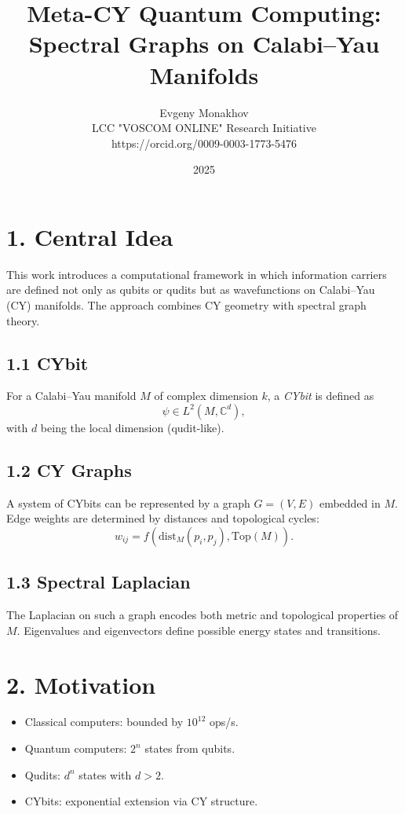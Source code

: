 \documentclass[12pt,a4paper]{article}
\title{Meta-CY Quantum Computing: Spectral Graphs on Calabi--Yau Manifolds}
\author{Evgeny Monakhov \\ LCC "VOSCOM ONLINE" Research Initiative \\ https://orcid.org/0009-0003-1773-5476}
\date{2025}
\begin{document}
\maketitle

\section*{1. Central Idea}
This work introduces a computational framework in which 
information carriers are defined not only as qubits or qudits 
but as wavefunctions on Calabi--Yau (CY) manifolds. 
The approach combines CY geometry with spectral graph theory.

\subsection*{1.1 CYbit}
For a Calabi--Yau manifold $M$ of complex dimension $k$, 
a \emph{CYbit} is defined as
\begin{equation}
\psi \in L^2(M, \mathbb{C}^d),
\end{equation}
with $d$ being the local dimension (qudit-like). 

\subsection*{1.2 CY Graphs}
A system of CYbits can be represented by a graph $G=(V,E)$ 
embedded in $M$. Edge weights are determined by distances 
and topological cycles:
\begin{equation}
w_{ij} = f(\mathrm{dist}_M(p_i,p_j), \mathrm{Top}(M)).
\end{equation}

\subsection*{1.3 Spectral Laplacian}
The Laplacian on such a graph encodes 
both metric and topological properties of $M$. 
Eigenvalues and eigenvectors define 
possible energy states and transitions.

\section*{2. Motivation}
\begin{itemize}
  \item Classical computers: bounded by $10^{12}$ ops/s.
  \item Quantum computers: $2^n$ states from qubits.
  \item Qudits: $d^n$ states with $d > 2$.
  \item CYbits: exponential extension via CY structure.
\end{itemize}
\end{document}
